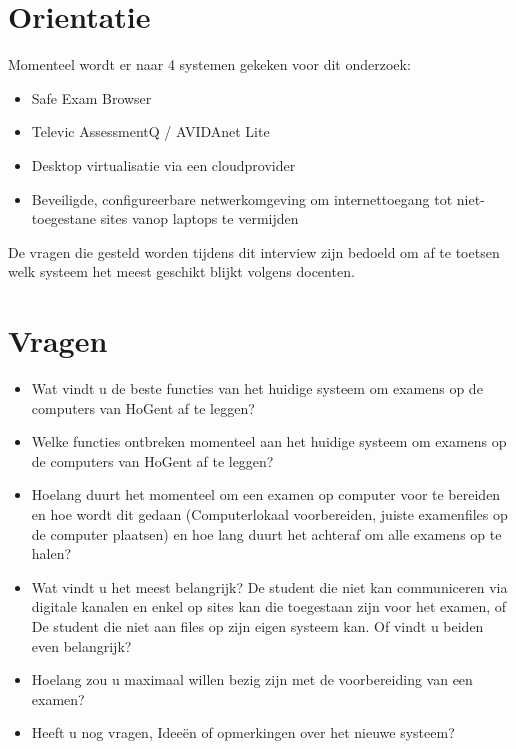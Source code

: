 
\section{Orientatie}

Momenteel wordt er naar 4 systemen gekeken voor dit onderzoek:
\begin{itemize}
	\item Safe Exam Browser 
	\item Televic AssessmentQ / AVIDAnet Lite
	\item Desktop virtualisatie via een cloudprovider
	\item Beveiligde, configureerbare netwerkomgeving om internettoegang tot niet-toegestane sites vanop laptops te vermijden
\end{itemize}
De vragen die gesteld worden tijdens dit interview zijn bedoeld om af te toetsen welk systeem het meest geschikt blijkt volgens docenten. 

\section{Vragen}

\begin{itemize}
	\item Wat vindt u de beste functies van het huidige systeem om examens op de computers van HoGent af te leggen?
	\bigskip 
	\item Welke functies ontbreken momenteel aan het huidige systeem om examens op de computers van HoGent af te leggen?
	\bigskip 
	\item Hoelang duurt het momenteel om een examen op computer voor te bereiden en hoe wordt dit gedaan (Computerlokaal voorbereiden, juiste examenfiles op de computer plaatsen) en hoe lang duurt het achteraf om alle examens op te halen?
	\bigskip 
	\item Wat vindt u het meest belangrijk? De student die niet kan communiceren via digitale kanalen en enkel op sites kan die toegestaan zijn voor het examen, of De student die niet aan files op zijn eigen systeem kan. Of vindt u beiden even belangrijk?
	\bigskip 
	\item Hoelang zou u maximaal willen bezig zijn met de voorbereiding van een examen?
	\bigskip 
	\item Heeft u nog vragen, Ideeën of opmerkingen over het nieuwe systeem?
	
\end{itemize}

